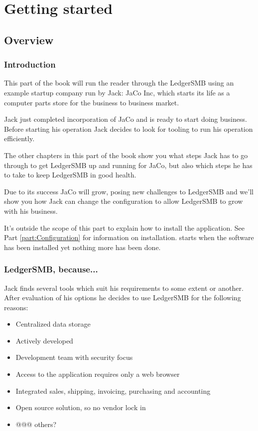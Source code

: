 

\part{Getting started}
\label{part:GettingStarted}

\chapter{Overview}

\section{Introduction}

This part of the book will run the reader through the LedgerSMB using an example
startup company run by Jack: JaCo Inc, which starts its life as a computer parts
store for the business to business market.

Jack just completed incorporation of JaCo and is ready to start doing business.
Before starting his operation Jack decides to look for tooling to run his operation
efficiently.

The other chapters in this part of the book show you what steps Jack has to go through
to get LedgerSMB up and running for JaCo, but also which steps he has to take to
keep LedgerSMB in good health.

Due to its success JaCo will grow, posing new challenges to LedgerSMB and we'll show
you how Jack can change the configuration to allow LedgerSMB to grow with his business.

It's outside the scope of this part to explain how to install the application. See
Part \ref{part:Configuration} for information on installation. 
starts when the software has been installed yet nothing more has been done.

\section{LedgerSMB, because...}

Jack finds several tools which suit his requirements to some extent or another.
After evaluation of his options he decides to use LedgerSMB for the following reasons:

\begin{itemize}
\item Centralized data storage
\item Actively developed
\item Development team with security focus
\item Access to the application requires only a web browser
\item Integrated sales, shipping, invoicing, purchasing and accounting
\item Open source solution, so no vendor lock in
\item @@@ others?
\end{itemize}


